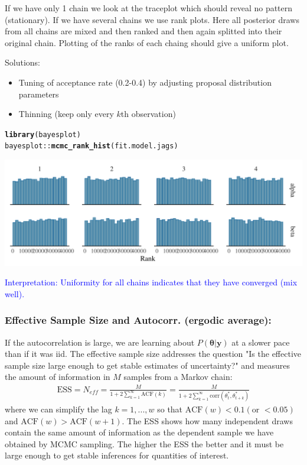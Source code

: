 \documentclass{article}\usepackage[]{graphicx}\usepackage[]{xcolor}
\makeatletter
\def\maxwidth{ %
  \ifdim\Gin@nat@width>\linewidth
    \linewidth
  \else
    \Gin@nat@width
  \fi
}
\newcommand{\hlopt}[1]{\textcolor[rgb]{0,0,0}{#1}}%
\newcommand{\hlstd}[1]{\textcolor[rgb]{0.345,0.345,0.345}{#1}}%
\newcommand{\hlkwd}[1]{\textcolor[rgb]{0.737,0.353,0.396}{\textbf{#1}}}%
\newenvironment{kframe}{%
 \def\at@end@of@kframe{}%
 \ifinner\ifhmode%
  \def\at@end@of@kframe{\end{minipage}}%
  \begin{minipage}{\columnwidth}%
 \fi\fi%
 \def\FrameCommand##1{\hskip\@totalleftmargin \hskip-\fboxsep
 \colorbox{shadecolor}{##1}\hskip-\fboxsep
     \hskip-\linewidth \hskip-\@totalleftmargin \hskip\columnwidth}%
 \MakeFramed {\advance\hsize-\width
   \@totalleftmargin\z@ \linewidth\hsize
   \@setminipage}}%
 {\par\unskip\endMakeFramed%
 \at@end@of@kframe}
\newenvironment{knitrout}{}{} %
\makeatother
\begin{document}
\begin{multicols*}{2}
If we have only 1 chain we look at the traceplot which should reveal no pattern (stationary). If we have several chains we use rank plots. Here all posterior draws from all chains are mixed and then ranked and then again splitted into their original chain. Plotting of the ranks of each chaing should give a uniform plot.

Solutions:
\begin{itemize}
\item Tuning of acceptance rate (0.2-0.4) by adjusting proposal distribution parameters
\item Thinning (keep only every $k$th observation)
\end{itemize}

\begin{knitrout}
\color{fgcolor}\begin{kframe}
\begin{alltt}
\hlkwd{library}\hlstd{(bayesplot)}
\hlstd{bayesplot}\hlopt{::}\hlkwd{mcmc_rank_hist}\hlstd{(fit.model.jags)}
\end{alltt}
\end{kframe}
\includegraphics[width=\maxwidth]{figure/rank_plot-1} 
\end{knitrout}

\textcolor{blue}{Interpretation: Uniformity for all chains indicates that they have converged (mix well).}

\subsubsection{Effective Sample Size and Autocorr. (ergodic average):}

If the autocorrelation is large, we are learning about $P(\boldsymbol{\theta|y})$ at a slower pace than if it was iid. The effective sample size addresses the question "Is the effective sample size large enough to get stable estimates of uncertainty?" and measures the amount of information in $M$ samples from a Markov chain:
\begin{align*}
\text{ESS}=N_{eff}=\frac{M}{1+2\sum_{k=1}^{\infty}\text{ACF}(k)}=\frac{M}{1+2\sum_{k=1}^{\infty}\text{corr}(\theta_t^*,\theta_{t+k}^*)}
\end{align*}
where we can simplify the lag $k=1,...,w$ so that $\text{ACF}(w)<0.1(\text{or }<0.05)$ and $\text{ACF}(w)>\text{ACF}(w+1)$. The ESS shows how many independent draws contain the same amount of information as the dependent sample we have obtained by MCMC sampling. The higher the ESS the better and it must be large enough to get stable inferences for quantities of interest. 


\end{multicols*}
\end{document}
